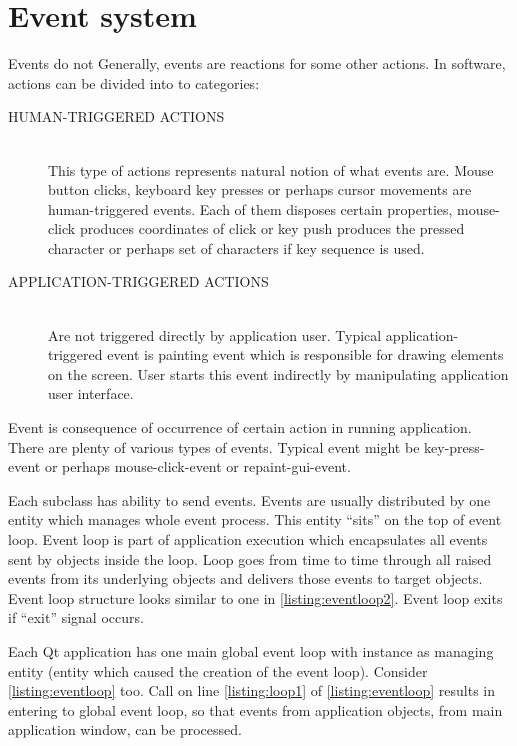 \section{Event system}\label{section:events}
Events do not  Generally, events are reactions for some other actions. In software, actions can be divided into to categories:
\begin{description}
\item[HUMAN-TRIGGERED ACTIONS] \hfill \\
This type of actions represents natural notion of what events are. Mouse button clicks, keyboard key presses or perhaps cursor movements are human-triggered events. Each of them disposes certain properties, \eg mouse-click produces coordinates of click or key push produces the pressed character or perhaps set of characters if key sequence is used.
\item[APPLICATION-TRIGGERED ACTIONS]  \hfill \\
Are not triggered directly by application user. Typical application-triggered event is painting event which is responsible for drawing  elements on the screen. User starts this event indirectly by manipulating application user interface.
\end{description}

Event is consequence of occurrence of certain action in running application. There are plenty of various types of events. Typical event might be key-press-event or perhaps mouse-click-event or repaint-gui-event.

Each subclass has ability to send events. Events are usually distributed by one entity which manages whole event process. This entity \enquote{sits} on the top of event loop. Event loop is part of application execution which encapsulates all events sent by objects inside the loop. Loop goes from time to time through all raised events from its underlying objects and delivers those events to target objects. Event loop structure looks similar to one in \autoref{listing:eventloop2}. Event loop exits if \enquote{exit} signal occurs.

Each Qt application has one main global event loop with instance as managing entity (entity which caused the creation of the event loop). Consider \autoref{listing:eventloop} too. Call on line \ref{listing:loop1} of \autoref{listing:eventloop} results in entering to global event loop, so that events from application objects, \eg from main application window, can be processed.


